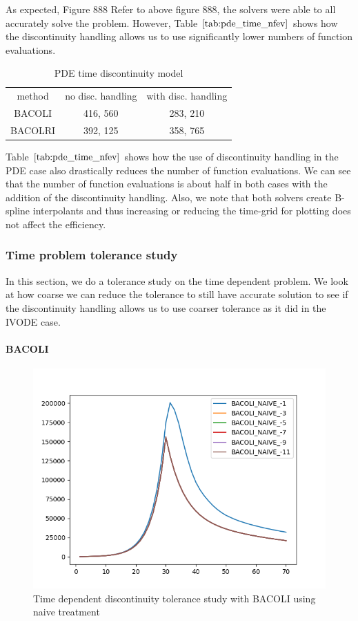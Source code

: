 \documentclass{article}
\begin{document}
As expected, Figure 888 Refer to above figure 888, the solvers were able to all accurately solve the problem. However, Table $\ref{tab:pde_time_nfev}$ shows how the discontinuity handling allows us to use significantly lower numbers of function evaluations.

\begin{table}[h]
\caption {PDE time discontinuity model} 
\label{tab:pde_time_nfev}
\begin{center}
\begin{tabular}{ c c c } 
method  & no disc. handling & with disc. handling \\ 
BACOLI  & 416, 560    &    283, 210     \\
BACOLRI & 392, 125     &   358, 765    \\
\end{tabular}
\end{center}
\end{table} 

Table $\ref{tab:pde_time_nfev}$ shows how the use of discontinuity handling in the PDE case also drastically reduces the number of function evaluations. We can see that the number of function evaluations is about half in both cases with the addition of the discontinuity handling. Also, we note that both solvers create B-spline interpolants and thus increasing or reducing the time-grid for plotting does not affect the efficiency. 

\subsubsection{Time problem tolerance study}
In this section, we do a tolerance study on the time dependent problem. We look at how coarse we can reduce the tolerance to still have accurate solution to see if the discontinuity handling allows us to use coarser tolerance as it did in the IVODE case.

\paragraph{BACOLI}

\begin{figure}[H]
\centering
\includegraphics[width=0.7\linewidth]{./figures/pde_time_disc_bacoli_naive_tol}
\caption{Time dependent discontinuity tolerance study with BACOLI using naive treatment}
\label{fig:pde_time_disc_bacoli_naive_tol}
\end{figure}
\end{document}
